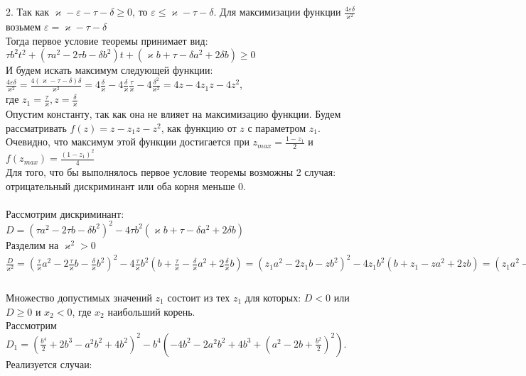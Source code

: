 \documentclass[a4paper]{article}
\begin{document}
2. Так как $\varkappa - \varepsilon - \tau - \delta \geq 0$, то $ \varepsilon \leq \varkappa - \tau - \delta$. Для максимизации функции $\frac{4\varepsilon\delta}{\varkappa^2}$ возьмем $\varepsilon = \varkappa - \tau - \delta$\\
Тогда первое условие теоремы принимает вид:\\
$\tau b^2t^2 + (\tau a^2-2 \tau b - \delta b^2)t + (\varkappa b+\tau-\delta a^2 + 2\delta b) \geq 0 $\\
И будем искать максимум следующей функции: $\frac{4\varepsilon\delta}{\varkappa^2} = \frac{4(\varkappa - \tau - \delta)\delta}{\varkappa^2} = 4\frac{\delta}{\varkappa} - 4\frac{\delta}{\varkappa}\frac{\tau}{\varkappa} - 4\frac{\delta^2}{\varkappa^2} = 4z-4z_1z - 4z^2$, \\
где $z_1 = \frac{\tau}{\varkappa}, z = \frac{\delta}{\varkappa}$\\
Опустим константу, так как она не влияет на максимизацию функции. Будем рассматривать $f(z) = z-z_1z - z^2$, как функцию от $z$ с параметром $z_1$.\\
Очевидно, что максимум этой функции достигается при $z_{max} = \frac{1-z_1}{2}$ и $f(z_{max}) = \frac{(1-z_1)^2}{4}$\\
Для того, что бы выполнялось первое условие теоремы возможны 2 случая: отрицательный дискриминант или оба корня меньше 0.\\\\

Рассмотрим дискриминант:\\ 
$D = (\tau a^2-2 \tau b - \delta b^2)^2 - 4\tau b^2 (\varkappa b+\tau-\delta a^2 + 2\delta b)$\\
Разделим на $\varkappa^2 > 0$\\
$\frac{D}{\varkappa^2} = (\frac{\tau}{\varkappa} a^2-2 \frac{\tau}{\varkappa}  b - \frac{\delta}{\varkappa}  b^2)^2 - 4\frac{\tau}{\varkappa}  b^2 (b+\frac{\tau}{\varkappa} -\frac{\delta}{\varkappa}  a^2 + 2\frac{\delta}{\varkappa}  b) = (z_1 a^2-2 z_1  b - z  b^2)^2 - 4z_1  b^2 (b+z_1  - z  a^2 + 2z b) = (z_1 a^2-2 z_1  b - \frac{1-z_1}{2} b^2)^2 - 4z_1  b^2 (b+z_1  - \frac{1-z_1}{2}  a^2 + 1-z_1 b)=z_1^2(-4b^2-2a^2b^2+4b^3+(a^2-2b+\frac{b^2}{2})^2)-z_1(\frac{b^4}{2}+2b^3-a^2b^2+4b^2) + \frac{b^4}{4}$\\\\

Множество допустимых значений $z_1$ состоит из тех $z_1$ для которых:   $D < 0$ или $D \geq 0$ и $x_2 < 0$, где $x_2$ наибольший корень.\\
Рассмотрим $D_1 = (\frac{b^4}{2}+2b^3-a^2b^2+4b^2)^2-b^4(-4b^2-2a^2b^2+4b^3+(a^2-2b+\frac{b^2}{2})^2)$. Реализуется случаи:\\\\
\end{document}
